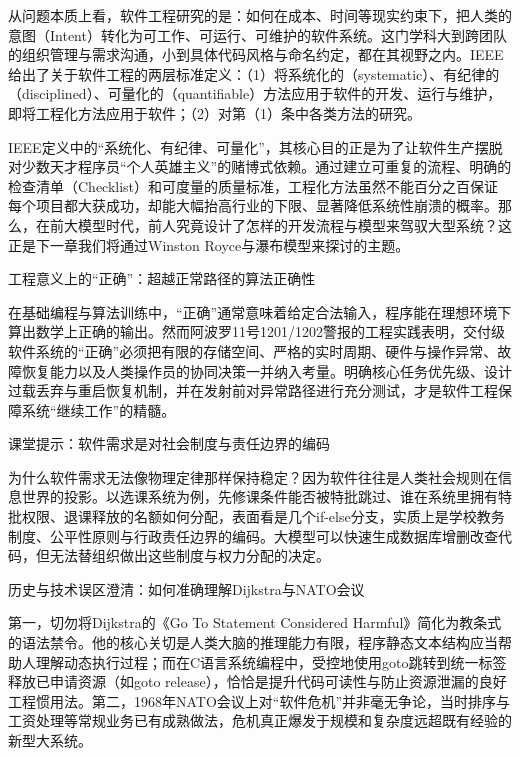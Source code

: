 \documentclass[UTF8,a4paper,11pt,fontset=fandol]{ctexart}
\begin{document}
从问题本质上看，软件工程研究的是：如何在成本、时间等现实约束下，把人类的意图（Intent）转化为可工作、可运行、可维护的软件系统。这门学科大到跨团队的组织管理与需求沟通，小到具体代码风格与命名约定，都在其视野之内。IEEE给出了关于软件工程的两层标准定义：（1）将系统化的（systematic）、有纪律的（disciplined）、可量化的（quantifiable）方法应用于软件的开发、运行与维护，即将工程化方法应用于软件；（2）对第（1）条中各类方法的研究。

IEEE定义中的“系统化、有纪律、可量化”，其核心目的正是为了让软件生产摆脱对少数天才程序员“个人英雄主义”的赌博式依赖。通过建立可重复的流程、明确的检查清单（Checklist）和可度量的质量标准，工程化方法虽然不能百分之百保证每个项目都大获成功，却能大幅抬高行业的下限、显著降低系统性崩溃的概率。那么，在前大模型时代，前人究竟设计了怎样的开发流程与模型来驾驭大型系统？这正是下一章我们将通过Winston Royce与瀑布模型来探讨的主题。

\begin{importantbox}{工程意义上的“正确”：超越正常路径的算法正确性}

在基础编程与算法训练中，“正确”通常意味着给定合法输入，程序能在理想环境下算出数学上正确的输出。然而阿波罗11号1201/1202警报的工程实践表明，交付级软件系统的“正确”必须把有限的存储空间、严格的实时周期、硬件与操作异常、故障恢复能力以及人类操作员的协同决策一并纳入考量。明确核心任务优先级、设计过载丢弃与重启恢复机制，并在发射前对异常路径进行充分测试，才是软件工程保障系统“继续工作”的精髓。

\end{importantbox}

\begin{knowledgebox}{课堂提示：软件需求是对社会制度与责任边界的编码}

为什么软件需求无法像物理定律那样保持稳定？因为软件往往是人类社会规则在信息世界的投影。以选课系统为例，先修课条件能否被特批跳过、谁在系统里拥有特批权限、退课释放的名额如何分配，表面看是几个if-else分支，实质上是学校教务制度、公平性原则与行政责任边界的编码。大模型可以快速生成数据库增删改查代码，但无法替组织做出这些制度与权力分配的决定。

\end{knowledgebox}

\begin{warningbox}{历史与技术误区澄清：如何准确理解Dijkstra与NATO会议}

第一，切勿将Dijkstra的《Go To Statement Considered Harmful》简化为教条式的语法禁令。他的核心关切是人类大脑的推理能力有限，程序静态文本结构应当帮助人理解动态执行过程；而在C语言系统编程中，受控地使用goto跳转到统一标签释放已申请资源（如goto release），恰恰是提升代码可读性与防止资源泄漏的良好工程惯用法。第二，1968年NATO会议上对“软件危机”并非毫无争论，当时排序与工资处理等常规业务已有成熟做法，危机真正爆发于规模和复杂度远超既有经验的新型大系统。

\end{warningbox}
\end{document}

